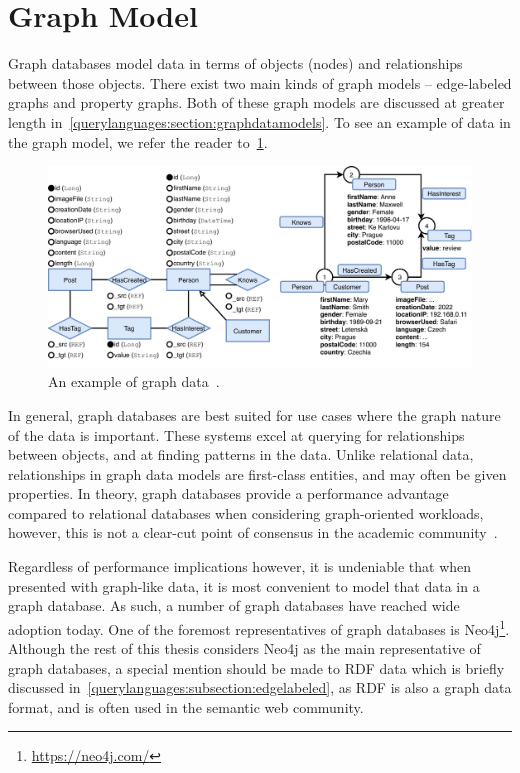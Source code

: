 \section{Graph Model}

Graph databases model data in terms of objects (nodes) and relationships between those objects.
There exist two main kinds of graph models -- edge-labeled graphs and property graphs.
Both of these graph models are discussed at greater length in~\cref{querylanguages:section:graphdatamodels}.
To see an example of data in the graph model, we refer the reader to~\cref{fig:graphdata}.

\begin{figure}[h]
\centering
\includegraphics[scale=0.66]{img/example-graph.pdf}
\caption{An example of graph data~\cite{inference}.}
\label{fig:graphdata}
\end{figure}

In general, graph databases are best suited for use cases where the graph nature of the data is important.
These systems excel at querying for relationships between objects, and at finding patterns in the data.
Unlike relational data, relationships in graph data models are first-class entities, and may often be given properties.
In theory, graph databases provide a performance advantage compared to relational databases when considering graph-oriented workloads, however, this is not a clear-cut point of consensus in the academic community~\cite{against_graph}.

Regardless of performance implications however, it is undeniable that when presented with graph-like data, it is most convenient to model that data in a graph database.
As such, a number of graph databases have reached wide adoption today.
One of the foremost representatives of graph databases is Neo4j\footnote{\url{https://neo4j.com/}}.
Although the rest of this thesis considers Neo4j as the main representative of graph databases, a special mention should be made to RDF data which is briefly discussed in~\cref{querylanguages:subsection:edgelabeled}, as RDF is also a graph data format, and is often used in the semantic web community.

